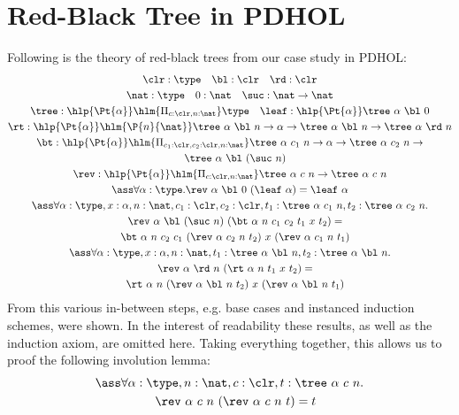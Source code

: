 \section{Red-Black Tree in PDHOL}\label{app:rbt}
Following is the theory of red-black trees from our case study in PDHOL:
\begin{gather*}
  \clr:\type\quad\bl:\clr\quad\rd:\clr\\
  \nat:\type\quad 0:\nat\quad \suc:\nat\to\nat\\
  \tree:\hlp{\Pt{\alpha}}\hlm{\Pi_{c:\clr,n:\nat}} \type
  \quad\leaf:\hlp{\Pt{\alpha}} \tree\ \alpha\ \bl\ 0\\
  \rt:\hlp{\Pt{\alpha}}\hlm{\P{n}{\nat}}\tree\ \alpha\ \bl\ n \to \alpha \to \tree\ \alpha\
  \bl\ n \to \tree\ \alpha\ \rd\ n\\
  \bt:\hlp{\Pt{\alpha}}\hlm{\Pi_{c_1:\clr,c_2:\clr,n:\nat}} \tree\ \alpha\ c_1\ n \to
  \alpha \to \tree\ \alpha\  c_2\ n \to\\ \quad \tree\ \alpha\ \bl\ (\suc\ n)\\
  \rev:\hlp{\Pt{\alpha}}\hlm{\Pi_{c:\clr,n:\nat}} \tree\ \alpha\ c\ n \to \tree\ \alpha\ c\
  n\\
  \ass\forall\alpha:\type.\rev\ \alpha\ \bl\ 0\ (\leaf\ \alpha) = \leaf\ \alpha\\
  \ass\forall\alpha:\type,x:\alpha,n:\nat,c_1:\clr,c_2:\clr,t_1:\tree\ \alpha\ c_1\
  n,t_2:\tree\ \alpha\ c_2\ n.\\
  \quad \rev\ \alpha\ \bl\ (\suc\ n)\ (\bt\ \alpha\ n\ c_1\ c_2\ t_1\ x\ t_2) = \\
  \quad \bt\ \alpha\ n\ c_2\ c_1\ (\rev\ \alpha\ c_2\ n\ t_2)\ x\ (\rev\ \alpha\ c_1\ n\ t_1)\\
  \ass\forall\alpha:\type,x:\alpha,n:\nat,t_1:\tree\ \alpha\ \bl\ n,t_2:\tree\ \alpha\ \bl\ n.\\
  \quad \rev\ \alpha\ \rd\ n\ (\rt\ \alpha\ n\ t_1\ x\ t_2) =\\
  \quad \rt\ \alpha\ n\ (\rev\ \alpha\ \bl\ n\ t_2)\ x\ (\rev\ \alpha\ \bl\ n\ t_1)\\
\end{gather*}
From this various in-between steps, e.g. base cases and instanced induction schemes, were
shown. In the interest of readability these results, as well as the induction axiom, are
omitted here. Taking everything together, this allows us to proof the following involution
lemma:  %
\begin{gather*}
  \ass\forall\alpha:\type,n:\nat,c:\clr,t:\tree\ \alpha\ c\ n.\\
  \quad \rev\ \alpha\ c\ n\ (\rev\ \alpha\ c\ n\ t) = t
\end{gather*}

